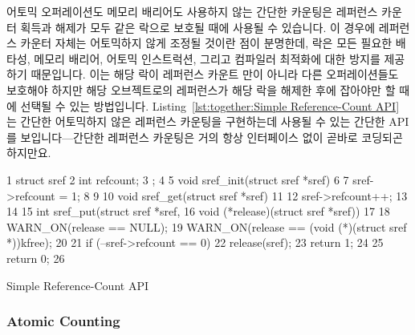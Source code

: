 어토믹 오퍼레이션도 메모리 배리어도 사용하지 않는 간단한 카운팅은 레퍼런스
카운터 획득과 해제가 모두 같은 락으로 보호될 때에 사용될 수 있습니다.
이 경우에 레퍼런스 카운터 자체는 어토믹하지 않게 조정될 것이란 점이 분명한데,
락은 모든 필요한 배타성, 메모리 배리어, 어토믹 인스트럭션, 그리고 컴파일러
최적화에 대한 방지를 제공하기 때문입니다.
이는 해당 락이 레퍼런스 카운트 만이 아니라 다른 오퍼레이션들도 보호해야 하지만
해당 오브젝트로의 레퍼런스가 해당 락을 해제한 후에 잡아야만 할 때에 선택될 수
있는 방법입니다.
Listing~\ref{lst:together:Simple Reference-Count API} 는 간단한 어토믹하지 않은
레퍼런스 카운팅을 구현하는데 사용될 수 있는 간단한 API 를 보입니다---간단한
레퍼런스 카운팅은 거의 항상 인터페이스 없이 곧바로 코딩되곤 하지만요.
\iffalse

Simple counting, with neither atomic operations nor memory barriers,
can be used when the reference-counter acquisition and release are
both protected by the same lock.
In this case, it should be clear that the reference count itself
may be manipulated non-atomically, because the lock provides any
necessary exclusion, memory barriers, atomic instructions, and disabling
of compiler optimizations.
This is the method of choice when the lock is required to protect
other operations in addition to the reference count, but where
a reference to the object must be held after the lock is released.
Listing~\ref{lst:together:Simple Reference-Count API} shows a simple
API that might be used to implement simple non-atomic reference
counting---although simple reference counting is almost always
open-coded instead.
\fi

\begin{listing}[tbp]
{ \scriptsize
\begin{verbbox}
  1 struct sref {
  2   int refcount;
  3 };
  4
  5 void sref_init(struct sref *sref)
  6 {
  7   sref->refcount = 1;
  8 }
  9
 10 void sref_get(struct sref *sref)
 11 {
 12   sref->refcount++;
 13 }
 14
 15 int sref_put(struct sref *sref,
 16              void (*release)(struct sref *sref))
 17 {
 18   WARN_ON(release == NULL);
 19   WARN_ON(release == (void (*)(struct sref *))kfree);
 20
 21   if (--sref->refcount == 0) {
 22     release(sref);
 23     return 1;
 24   }
 25   return 0;
 26 }
\end{verbbox}
}
\centering
\theverbbox
\caption{Simple Reference-Count API}
\label{lst:together:Simple Reference-Count API}
\end{listing}

\subsubsection{Atomic Counting}
\label{sec:together:Atomic Counting}

